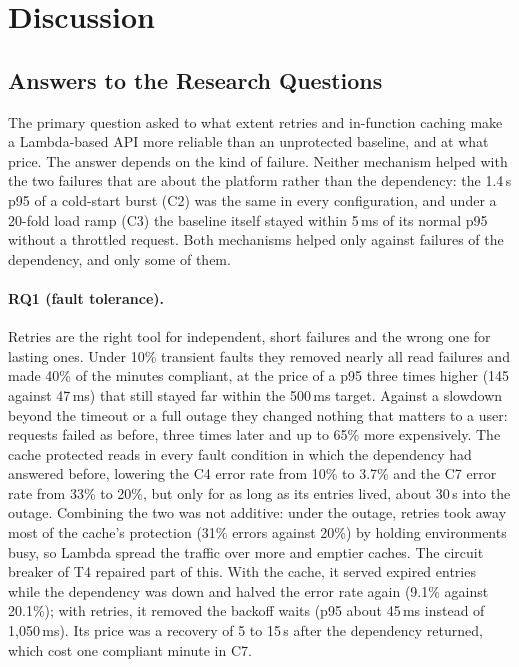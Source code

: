 \documentclass[10pt]{article}
\begin{document}
\section{Discussion}
\subsection{Answers to the Research Questions}
The primary question asked to what extent retries and in-function caching make
a Lambda-based API more reliable than an unprotected baseline, and at what
price. The answer depends on the kind of failure. Neither mechanism helped with
the two failures that are about the platform rather than the dependency: the
1.4\,s p95 of a cold-start burst (C2) was the same in every configuration, and
under a 20-fold load ramp (C3) the baseline itself stayed within 5\,ms of its
normal p95 without a throttled request. Both mechanisms helped only against
failures of the dependency, and only some of them.

\paragraph{RQ1 (fault tolerance).} Retries are the right tool for independent,
short failures and the wrong one for lasting ones. Under 10\% transient faults
they removed nearly all read failures and made 40\% of the minutes compliant,
at the price of a p95 three times higher (145 against 47\,ms) that still stayed
far within the 500\,ms target. Against a slowdown beyond the timeout or a full
outage they changed nothing that matters to a user: requests failed as before,
three times later and up to 65\% more expensively. The cache protected reads in
every fault condition in which the dependency had answered before, lowering the
C4 error rate from 10\% to 3.7\% and the C7 error rate from 33\% to 20\%, but
only for as long as its entries lived, about 30\,s into the outage. Combining
the two was not additive: under the outage, retries took away most of the
cache's protection (31\% errors against 20\%) by holding environments busy, so
Lambda spread the traffic over more and emptier caches. The circuit breaker of
T4 repaired part of this. With the cache, it served expired entries while the
dependency was down and halved the error rate again (9.1\% against 20.1\%);
with retries, it removed the backoff waits (p95 about 45\,ms instead of
1{,}050\,ms). Its price was a recovery of 5 to 15\,s after the dependency
returned, which cost one compliant minute in C7.
\end{document}
